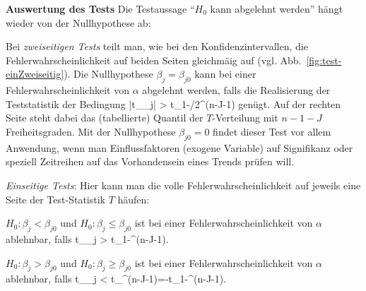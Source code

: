 


\item \textbf{Auswertung des Tests}
Die Testaussage ``$H_0$ kann abgelehnt werden'' h\"angt wieder von der
Nullhypothese ab:
\bi
\item Bei \emph{zweiseitigen Tests}  teilt man, wie bei den Konfidenzintervallen,
die Fehlerwahrscheinlichkeit auf beiden Seiten gleichm\"a\3ig auf
(vgl. Abb.~\ref{fig:test-einZweiseitig}). Die Nullhypothese 
$\beta_j=\beta_{j0}$ kann bei einer Fehlerwahrscheinlichkeit von
$\alpha$  abgelehnt werden, falls
die Realisierung der Teststatistik der Bedingung
\be
\label{testbsymm}
|t_{\beta_j}| > t_{1-\alpha/2}^{(n-J-1)}
\ee
gen\"ugt. Auf der rechten Seite steht dabei das (tabellierte) Quantil
der $T$-Verteilung mit $n-1-J$ Freiheitsgraden. 
Mit der Nullhypothese $\beta_{j0}=0$ findet dieser Test 
vor allem Anwendung, wenn man 
Einflussfaktoren (exogene Variable) auf Signifikanz oder speziell
Zeitreihen auf das 
Vorhandensein eines Trends pr\"ufen will.

\item \emph{Einseitige Tests}: Hier kann man die volle
Fehlerwahrscheinlichkeit auf jeweils eine Seite der Test-Statistik $T$
h\"aufen: 
\bi
\item $H_0:\beta_j<\beta_{j0}$ und  $H_0:\beta_j \le \beta_{j0}$ ist
bei einer Fehlerwahrscheinlichkeit von $\alpha$ ablehnbar, falls
\be
\label{testasymm-gt}
t_{\beta_j} > t_{1-\alpha}^{(n-J-1)}.
\ee
\item $H_0:\beta_j>\beta_{j0}$ und  $H_0:\beta_j \ge \beta_{j0}$ ist
bei einer Fehlerwahrscheinlichkeit von $\alpha$ ablehnbar, falls
\be
\label{testasymm-lt}
t_{\beta_j} < t_{\alpha}^{(n-J-1)}=-t_{1-\alpha}^{(n-J-1)}.
\ee
\ei
\ei
\eenum

